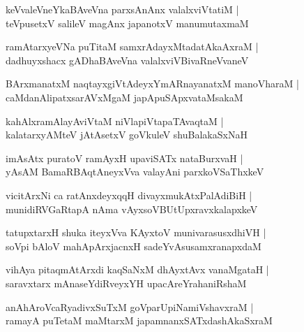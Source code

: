 \documentclass[twoside,12pt,openright]{book}
\newcounter{shloka}[chapter]
\begin{document}
\begin{shloka}%
keVvaleVneYkaBAveVna parxsAnAnx valalxviVtatiM |\\
teVpusetxV salileV magAnx japanotxV manumutaxmaM 
\end{shloka}

\begin{shloka}%
ramAtarxyeVNa puTitaM samxrAdayxMtadatAkaAxraM |\\
dadhuyxshacx gADhaBAveVna valalxviVBivaRneVvaneV 
\end{shloka}

\begin{shloka}%
BArxmanatxM naqtayxgiVtAdeyxYmARnayanatxM manoVharaM |\\
caMdanAlipatxsarAVxMgaM japApuSApxvataMsakaM 
\end{shloka}

\begin{shloka}%
kahAlxramAlayAviVtaM niVlapiVtapaTAvaqtaM |\\
kalatarxyAMteV jAtAsetxV goVkuleV shuBalakaSxNaH
\end{shloka}

\begin{shloka}%
imAsAtx puratoV ramAyxH upaviSATx nataBurxvaH |\\
yAsAM BamaRBAqtAneyxVva valayAni parxkoVSaThxkeV 
\end{shloka}

\begin{shloka}%
vicitArxNi ca ratAnxdeyxqqH divayxmukAtxPalAdiBiH |\\
munidiRVGaRtapA nAma vAyxsoVBUtUpxravxkalapxkeV 
\end{shloka}

\begin{shloka}%
tatupxtarxH shuka iteyxVva KAyxtoV munivarasusxdhiVH |\\
soVpi bAloV mahApArxjacnxH sadeYvAsusamxranapxdaM 
\end{shloka}

\begin{shloka}%
vihAya pitaqmAtArxdi kaqSaNxM dhAyxtAvx vanaMgataH |\\
saravxtarx mAnaseYdiRveyxYH upacAreYrahaniRshaM 
\end{shloka}

\begin{shloka}%
anAhAroVcaRyadivxSuTxM goVparUpiNamiVshavxraM |\\
ramayA puTetaM maMtarxM japamnanxSATxdashAkaSxraM 
\end{shloka}
\end{document}
